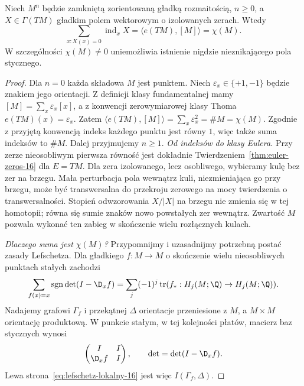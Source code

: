 \begin{twierdzenie}
\label{thm:poincare-hopf-16}
Niech $M^n$ będzie zamkniętą zorientowaną gładką
rozmaitością, $n\geq0$, a
$X\in\Gamma(TM)$ gładkim polem wektorowym
o izolowanych zerach. Wtedy
\begin{equation}\label{eq:poincare-hopf-16}
 \sum_{x:X(x)=0}
     \operatorname{ind}_x X
 =\langle e(TM),[M]\rangle
 =\chi(M).
\end{equation}
W szczególności
$\chi(M)\ne0$
uniemożliwia istnienie
nigdzie nieznikającego
pola stycznego.
\end{twierdzenie}
\begin{proof}
Dla $n=0$ każda składowa $M$ jest punktem.
Niech $\varepsilon_x\in\{+1,-1\}$ będzie znakiem jego
orientacji. Z definicji klasy fundamentalnej mamy
$[M]=\sum_x\varepsilon_x[x]$, a z konwencji
zerowymiarowej klasy Thoma
$e(TM)(x)=\varepsilon_x$. Zatem
$\langle e(TM),[M]\rangle
=\sum_x\varepsilon_x^2=\#M=\chi(M)$.
Zgodnie z przyjętą konwencją indeks każdego punktu
jest równy $1$, więc także suma indeksów to $\#M$.
Dalej przyjmujemy $n\geq1$.
\emph{Od indeksów do klasy Eulera.}
Przy zerze nieosobliwym
pierwsza równość jest
dokładnie
Twierdzeniem~\ref{thm:euler-zeros-16}
dla $E=TM$. Dla zera
izolowanego, lecz
osobliwego, wybieramy
kulę bez zer na
brzegu. Mała perturbacja
pola wewnątrz kuli,
niezmieniająca go
przy brzegu, może być
transwersalna do
przekroju zerowego
na mocy twierdzenia o transwersalności.
Stopień odwzorowania
$X/|X|$ na brzegu
nie zmienia się
w tej homotopii;
równa się sumie
znaków nowo
powstałych zer
wewnątrz. Zwartość
$M$ pozwala wykonać
ten zabieg w
skończenie wielu
rozłącznych kulach.

\emph{Dlaczego suma jest $\chi(M)$?}
Przypomnijmy i uzasadnijmy
potrzebną postać
zasady Lefschetza.
Dla gładkiego
$f:M\to M$ o
skończenie wielu
nieosobliwych
punktach stałych
zachodzi
\begin{equation}\label{eq:lefschetz-lokalny-16}
 \sum_{f(x)=x}
    \operatorname{sgn}\det(I-\D_xf)
 =\sum_j(-1)^j
    \operatorname{tr}
      (f_*:H_j(M;\Q)\to H_j(M;\Q)).
\end{equation}
Nadajemy grafowi $\Gamma_f$ i przekątnej $\Delta$
orientacje przeniesione z $M$, a $M\times M$ orientację
produktową. W punkcie stałym, w tej kolejności płatów,
macierz baz stycznych wynosi
\[
 \begin{pmatrix}I&I\\\D_xf&I\end{pmatrix},
 \qquad \det=\det(I-\D_xf).
\]
Lewa strona~\eqref{eq:lefschetz-lokalny-16}
jest więc $I(\Gamma_f,\Delta)$.


\end{proof}
